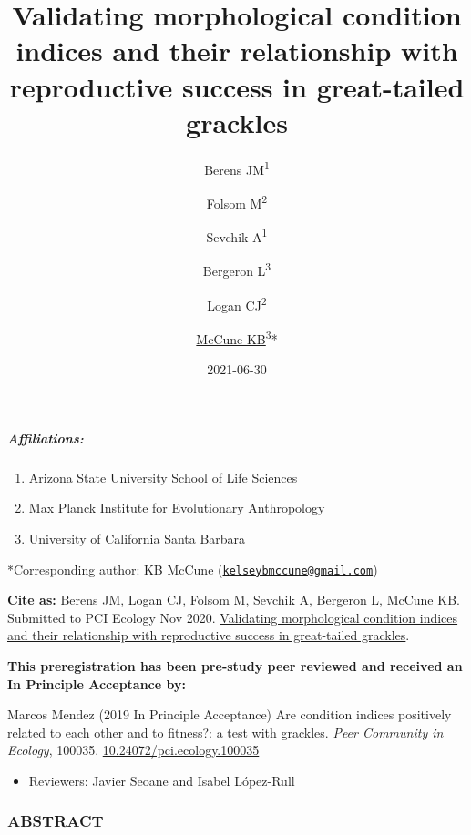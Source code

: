 \documentclass[
]{article}
\title{Validating morphological condition indices and their relationship
with reproductive success in great-tailed grackles}
\author{Berens JM\textsuperscript{1} \and Folsom
M\textsuperscript{2} \and Sevchik A\textsuperscript{1} \and Bergeron
L\textsuperscript{3} \and \href{http://CorinaLogan.com}{Logan
CJ}\textsuperscript{2} \and \href{https://www.kelseymccune.com/}{McCune
KB}\textsuperscript{3}*}
\date{2021-06-30}
\providecommand{\tightlist}{%
  \setlength{\itemsep}{0pt}\setlength{\parskip}{0pt}}
\begin{document}
\maketitle

\hypertarget{affiliations}{%
\subparagraph{Affiliations:}\label{affiliations}}

\begin{enumerate}
\def\labelenumi{\arabic{enumi})}
\tightlist
\item
  Arizona State University School of Life Sciences
\item
  Max Planck Institute for Evolutionary Anthropology
\item
  University of California Santa Barbara
\end{enumerate}

*Corresponding author: KB McCune
(\href{mailto:kelseybmccune@gmail.com}{\nolinkurl{kelseybmccune@gmail.com}})

\textbf{Cite as:} Berens JM, Logan CJ, Folsom M, Sevchik A, Bergeron L,
McCune KB. Submitted to PCI Ecology Nov 2020.
\href{http://corinalogan.com/Preregistrations/gcondition.html}{Validating
morphological condition indices and their relationship with reproductive
success in great-tailed grackles}.

\textbf{This preregistration has been pre-study peer reviewed and
received an In Principle Acceptance by:}

Marcos Mendez (2019 In Principle Acceptance) Are condition indices
positively related to each other and to fitness?: a test with grackles.
\emph{Peer Community in Ecology}, 100035.
\href{https://doi.org/10.24072/pci.ecology.100035}{10.24072/pci.ecology.100035}

\begin{itemize}
\tightlist
\item
  Reviewers: Javier Seoane and Isabel López-Rull
\end{itemize}

\hypertarget{abstract}{%
\subsubsection{ABSTRACT}\label{abstract}}
\end{document}

